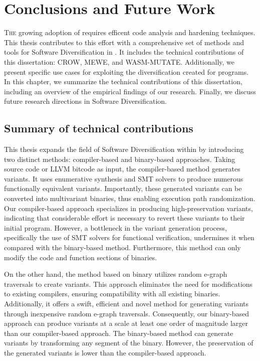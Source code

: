 
\chapter{Conclusions and Future Work}
\label{results}


\lettrine[lines=3]{T}{he} growing adoption of \Wasm requires efficent code analysis and hardening techniques.
This thesis contributes to this effort with a comprehensive set of methods and tools for Software Diversification in \Wasm.
It includes the technical contributions of this dissertation: CROW, MEWE, and WASM-MUTATE.
Additionally, we present specific use cases for exploiting the diversification created for \Wasm programs.
In this chapter, we summarize the technical contributions of this dissertation, including an overview of the empirical findings of our research.
Finally, we discuss future research directions in \Wasm Software Diversification.

\section{Summary of technical contributions}

This thesis expands the field of Software Diversification within \Wasm by introducing two distinct methods: compiler-based and binary-based approaches. 
Taking source code or LLVM bitcode as input, the compiler-based method generates \Wasm variants.
It uses enumerative synthesis and SMT solvers to produce numerous functionally equivalent variants. 
Importantly, these generated variants can be converted into multivariant binaries, thus enabling execution path randomization. 
Our compiler-based approach specializes in producing high-preservation variants, indicating that considerable effort is necessary to revert these variants to their initial program. 
However, a bottleneck in the variant generation process, specifically the use of SMT solvers for functional verification, undermines it when compared with the binary-based method. 
Furthermore, this method can only modify the code and function sections of \Wasm binaries.

On the other hand, the method based on binary utilizes random e-graph traversals to create variants. 
This approach eliminates the need for modifications to existing compilers, ensuring compatibility with all existing \Wasm binaries. 
Additionally, it offers a swift, efficient and novel method for generating variants through inexpensive random e-graph traversals. 
Consequently, our binary-based approach can produce variants at a scale at least one order of magnitude larger than our compiler-based approach. 
The binary-based method can generate variants by transforming any segment of the \wasm binary.
However, the preservation of the generated variants is lower than the compiler-based approach.


